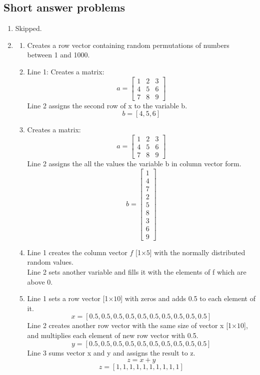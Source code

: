 \documentclass[man]{apa6}
\begin{document}
\subsection{Short answer problems}
	\begin{enumerate}
		\item Skipped.
		
		\item 
			\begin{enumerate}
				\item Creates a row vector containing random permutations of numbers between 1 and 1000.
				
				\item Line 1: Creates a matrix: \\
					\[ a= \left[ \begin{array}{ccc}
					1 & 2 & 3 \\
					4 & 5 & 6 \\
					7 & 8 & 9 \end{array} \right]\] 
					Line 2 assigns the second row of x to the variable b.
					$$ b = [4,5,6]$$

				\item Creates a matrix: \\
					\[ a= \left[ \begin{array}{ccc}
					1 & 2 & 3 \\
					4 & 5 & 6 \\
					7 & 8 & 9 \end{array} \right]\] 
					Line 2 assigns the all the values the variable b in column vector form.
					\[ b= \left[ \begin{array}{c}
					1 \\ 4 \\ 7 \\
					2 \\ 5 \\ 8 \\
					3 \\ 6 \\ 9 \end{array} \right]\] 

				\item Line 1 creates the column vector $f$ [1$\times5$] with the normally distributed random values. \\
					Line 2 sets another variable and fills it with the elements of f which are above 0.

				\item Line 1 sets a row vector  [1$\times10$] with zeros and adds 0.5 to each element of it.
					$$x= [0.5,0.5,0.5,0.5,0.5,0.5,0.5,0.5,0.5,0.5]$$
					Line 2 creates another row vector with the same size of vector x [1$\times10$], and multiplies each element of new row vector with 0.5. \\
					$$y= [0.5,0.5,0.5,0.5,0.5,0.5,0.5,0.5,0.5,0.5]$$
					Line 3 sums vector x and y and assigns the result to z.
					$$z = x + y$$
					$$z= [1,1,1,1,1,1,1,1,1,1]$$
					

\end{enumerate}
\end{enumerate}
\end{document}

